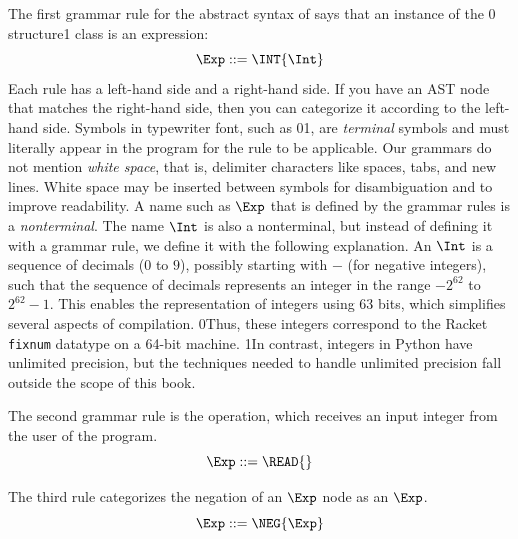 \documentclass[7x10]{TimesAPriori_MIT}%
\def\racketEd{0}
\def\pythonEd{1}
\def\edition{1}
\newcommand{\racket}[1]{{\if\edition\racketEd{#1}\fi}}
\newcommand{\pythonColor}[0]{}
\newcommand{\python}[1]{{\if\edition\pythonEd\pythonColor #1\fi}}
\numberwithin{theorem}{chapter}
\numberwithin{definition}{chapter}
\numberwithin{equation}{chapter}
\begin{document}
The first grammar rule for the abstract syntax of \LangInt{} says that an
instance of the \racket{ structure}\python{ class} is an expression:
\begin{equation}
\Exp ::= \INT{\Int}  \label{eq:arith-int}
\end{equation}
%
Each rule has a left-hand side and a right-hand side.
If you have an AST node that matches the
right-hand side, then you can categorize it according to the
left-hand side.
%
Symbols in typewriter font, such as \racket{}\python{},
are \emph{terminal} symbols and must literally appear in the program for the
rule to be applicable.
%
Our grammars do not mention \emph{white space}, that is, delimiter
characters like spaces, tabs, and new lines. White space may be
inserted between symbols for disambiguation and to improve
readability.  
%
A name such as $\Exp$ that is defined by the grammar rules is a
\emph{nonterminal}.  
%
The name $\Int$ is also a nonterminal, but instead of defining it with
a grammar rule, we define it with the following explanation.  An
$\Int$ is a sequence of decimals ($0$ to $9$), possibly starting with
$-$ (for negative integers), such that the sequence of decimals
represents an integer in the range $-2^{62}$ to $2^{62}-1$.  This
enables the representation of integers using 63 bits, which simplifies
several aspects of compilation.
%
\racket{Thus, these integers correspond to the Racket \texttt{fixnum}
  datatype on a 64-bit machine.}
%
\python{In contrast, integers in Python have unlimited precision, but
  the techniques needed to handle unlimited precision fall outside the
  scope of this book.}

The second grammar rule is the \READOP{} operation, which receives an
input integer from the user of the program.
\begin{equation}
  \Exp ::= \READ{} \label{eq:arith-read}
\end{equation}

The third rule categorizes the negation of an $\Exp$ node as an
$\Exp$.
\begin{equation}
  \Exp ::= \NEG{\Exp}  \label{eq:arith-neg}
\end{equation}
\end{document}
